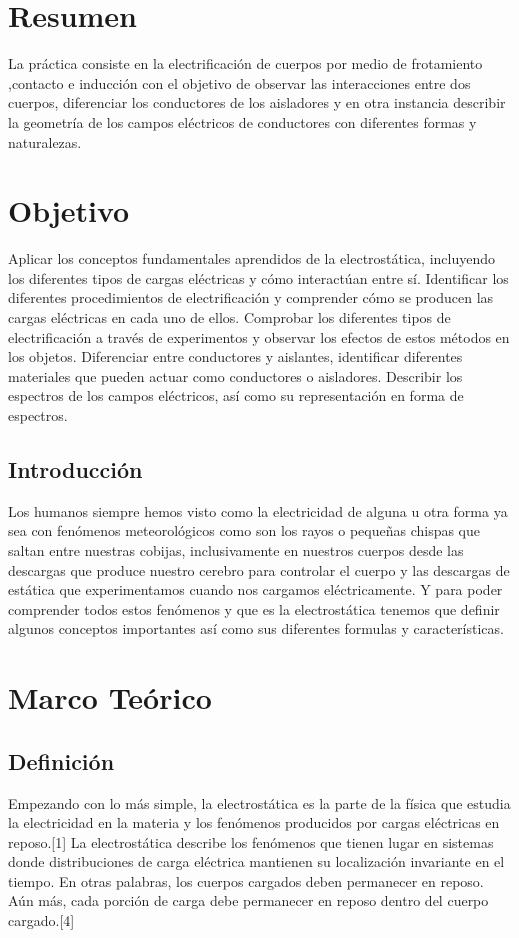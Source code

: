 \documentclass[10pt]{article}
\begin{document}
\section{Resumen}
La práctica consiste en la electrificación de cuerpos por medio de frotamiento ,contacto e inducción con el objetivo de observar las interacciones entre dos cuerpos, diferenciar los conductores de los aisladores y en otra instancia describir la geometría de los campos eléctricos de conductores con diferentes formas y naturalezas.
\begin{multicols}{2}

	\section{Objetivo}

	Aplicar los conceptos fundamentales aprendidos de la electrostática, incluyendo los diferentes tipos de cargas eléctricas y cómo interactúan entre sí.
	Identificar los diferentes procedimientos de electrificación y comprender cómo se producen las cargas eléctricas en cada uno de ellos.
	Comprobar los diferentes tipos de electrificación a través de experimentos y observar los efectos de estos métodos en los objetos.
	Diferenciar entre conductores y aislantes, identificar diferentes materiales que pueden actuar como conductores o aisladores.
	Describir los espectros de los campos eléctricos, así como su representación en forma de espectros.
	\subsection{Introducción}
	Los humanos siempre hemos visto como la electricidad de alguna u otra forma ya sea con fenómenos meteorológicos como son los rayos o pequeñas chispas que saltan entre nuestras cobijas, inclusivamente en nuestros cuerpos desde las descargas que produce nuestro cerebro para controlar el cuerpo y las descargas de estática que experimentamos cuando nos cargamos eléctricamente. Y para poder comprender todos estos fenómenos y que es la electrostática tenemos que definir algunos conceptos importantes así como sus diferentes formulas y características.
	\section {Marco Teórico}

	\subsection{Definición}
	Empezando con lo más simple, la electrostática es la parte de la física que estudia la electricidad en la materia y los
	fenómenos producidos por cargas eléctricas en reposo.[1]
	La electrostática describe los fenómenos que tienen lugar en sistemas donde distribuciones de carga eléctrica mantienen su localización invariante en el tiempo. En
	otras palabras, los cuerpos cargados deben permanecer en reposo. Aún más, cada porción de carga debe permanecer en reposo dentro del cuerpo cargado.[4]

\end{multicols}
\end{document}
